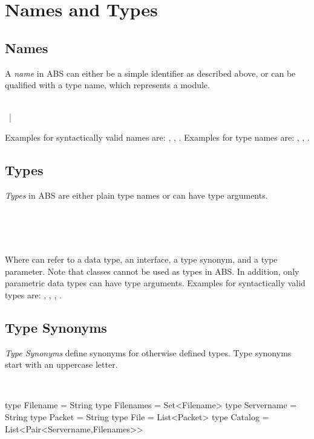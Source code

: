 \chapter{Names and Types}
\section{Names}
A \emph{name} in ABS can either be a simple identifier as described above, or can be qualified with a type name, which represents a module. 

\begin{abssyntax}
      {}\ \\
          {} ~|~ \ \ 
\end{abssyntax}

Examples for syntactically valid names are: , , . Examples for type names are: , , .

\section{Types}
\emph{Types} in ABS are either plain type names or can have type arguments.

\begin{abssyntax}
      {}\ \\
  \TRS{<}\ \ \TRS{>}\\
  {}\ 
\end{abssyntax}

Where  can refer to a data type, an interface, a type synonym, and a
type parameter. Note that classes cannot be used as types in ABS.
In addition, only parametric data types can have type arguments.
Examples for syntactically valid types are: , , 
,
.


\section{Type Synonyms} \label{sec:typesynonyms}
\emph{Type Synonyms} define synonyms for otherwise defined types. 
Type synonyms start with an uppercase letter.

\begin{abssyntax}
  {}\ \TRS{=}\ \ \TRS{;}  
\end{abssyntax}

\begin{absexample}
type Filename = String
type Filenames = Set<Filename>
type Servername = String
type Packet = String
type File =  List<Packet>
type Catalog = List<Pair<Servername,Filenames>>
\end{absexample}
